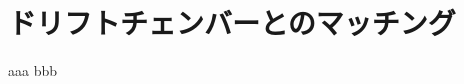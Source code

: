 \documentclass[report]{jsbook}
\begin{document}
\section{ドリフトチェンバーとのマッチング}

\begin{thebibliography}{99}
 aaa
 bbb
\end{thebibliography}


\begin{comment}
・文献の引用の仕方

データは参考文献\cite{rika} にあったものを使った．
この文献\cite{ten}も参考にした。

・図の挿入の仕方
\begin{figure}[h]
\begin{center}
\texttt{[image: ./plot1.pdf]}
\caption{サイン関数のグラフ}
\end{center}
\end{figure}


\begin{verbatim}
#include <iostream>
using namespace std;
int main() {
for(int i = 1; i <= 5; i++) {
cout << "こんにちは" << i << endl;
}
return 0;
}
\end{verbatim}
\verb|\usepackage{ascmac}|して\verb|screen| 環境を使うと，枠がつきます。
\begin{screen}
\begin{verbatim}
#include <iostream>
using namespace std;
int main() {
for(int i = 1; i <= 5; i++) {
cout << "こんにちは" << i << endl;
}
return 0;
}
\end{verbatim}
\end{screen}

\begin{thebibliography}{99}
\bibitem{rika} 国立天文台編，理科年表 (丸善)
\bibitem{ten} 天文年鑑，誠文堂新光社。
\end{thebibliography}

\end{comment}
\end{document}
